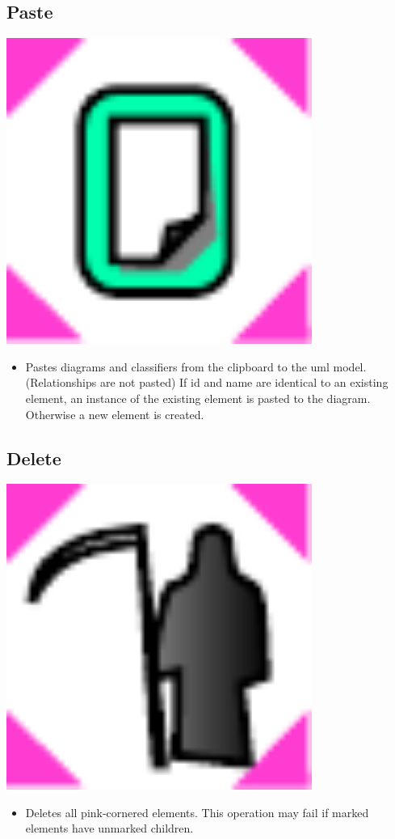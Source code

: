 \subsection{Paste}

\includegraphics[width=10cm]{../../gui/source/resources/edit_paste.pdf}
\begin{itemize}
\item Pastes diagrams and classifiers from the clipboard to the uml model. (Relationships are not pasted)
    If id and name are identical to an existing element, an instance of the existing element is pasted to the diagram.
    Otherwise a new element is created.
\end{itemize}

\subsection{Delete}

\includegraphics[width=10cm]{../../gui/source/resources/edit_delete.pdf}
\begin{itemize}
\item Deletes all pink-cornered elements. This operation may fail if marked elements have unmarked children.
\end{itemize}

